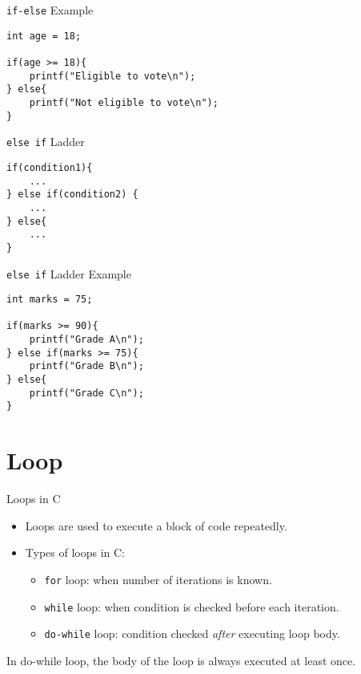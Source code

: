 \documentclass[12pt, aspectratio=169]{beamer}
\begin{document}
    \begin{frame}[fragile]{\texttt{if-else} Example}
        \begin{verbatim}
int age = 18;

if(age >= 18){
    printf("Eligible to vote\n");
} else{
    printf("Not eligible to vote\n");
}
        \end{verbatim}
    \end{frame}


    \begin{frame}[fragile]{\texttt{else if} Ladder}
        \begin{verbatim}
if(condition1){
    ...
} else if(condition2) {
    ...
} else{
    ...
}
        \end{verbatim}
    \end{frame}


    \begin{frame}[fragile]{\texttt{else if} Ladder Example}
        \begin{verbatim}
int marks = 75;

if(marks >= 90){
    printf("Grade A\n");
} else if(marks >= 75){
    printf("Grade B\n");
} else{
    printf("Grade C\n");
}
        \end{verbatim}
    \end{frame}


    \section{Loop}

    \begin{frame}{Loops in C}
        \begin{itemize}
            \item Loops are used to execute a block of code repeatedly.
            \item Types of loops in C:
            \begin{itemize}
                \item \texttt{for} loop: when number of iterations is known.
                \item \texttt{while} loop: when condition is checked before each iteration.
                \item \texttt{do-while} loop: condition checked \textit{after} executing loop body.
            \end{itemize}
        \end{itemize}

        In do-while loop, the body of the loop is always executed at least once.
    \end{frame}
\end{document}
